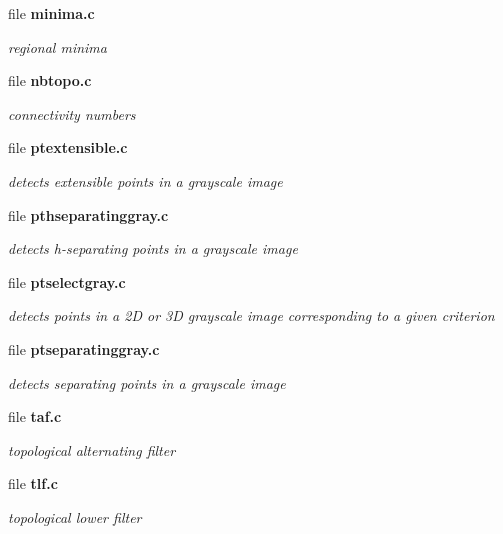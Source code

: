 \begin{CompactItemize}
\item 
file {\bf minima.c}
\begin{CompactList}\small\item\em regional minima \item\end{CompactList}

\item 
file {\bf nbtopo.c}
\begin{CompactList}\small\item\em connectivity numbers \item\end{CompactList}

\item 
file {\bf ptextensible.c}
\begin{CompactList}\small\item\em detects extensible points in a grayscale image \item\end{CompactList}

\item 
file {\bf pthseparatinggray.c}
\begin{CompactList}\small\item\em detects h-separating points in a grayscale image \item\end{CompactList}

\item 
file {\bf ptselectgray.c}
\begin{CompactList}\small\item\em detects points in a 2D or 3D grayscale image corresponding to a given criterion \item\end{CompactList}

\item 
file {\bf ptseparatinggray.c}
\begin{CompactList}\small\item\em detects separating points in a grayscale image \item\end{CompactList}

\item 
file {\bf taf.c}
\begin{CompactList}\small\item\em topological alternating filter \item\end{CompactList}

\item 
file {\bf tlf.c}
\begin{CompactList}\small\item\em topological lower filter \item\end{CompactList}


\end{CompactItemize}
